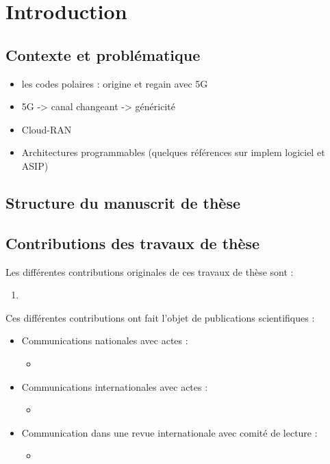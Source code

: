\chapter*{Introduction}

\section*{Contexte et problématique}

\begin{itemize}
 	\item les codes polaires : origine et regain avec 5G
 	\item 5G -> canal changeant -> généricité
 	\item Cloud-RAN
 	\item Architectures programmables (quelques références sur implem logiciel et ASIP)
\end{itemize}

\section*{Structure du manuscrit de thèse}


\section*{Contributions des travaux de thèse}
Les différentes contributions originales de ces travaux de thèse sont : 
\begin{enumerate}
	\item 
\end{enumerate}

Ces différentes contributions ont fait l'objet de publications scientifiques : \\
\begin{itemize}
	\item Communications nationales avec actes :
	\begin{itemize}
     	\item 
	\end{itemize}
	\item Communications internationales avec actes :
	\begin{itemize}
		\item 
	\end{itemize}
	\item Communication dans une revue internationale avec comité de lecture :
	\begin{itemize}
		\item 
	\end{itemize}
\end{itemize}



